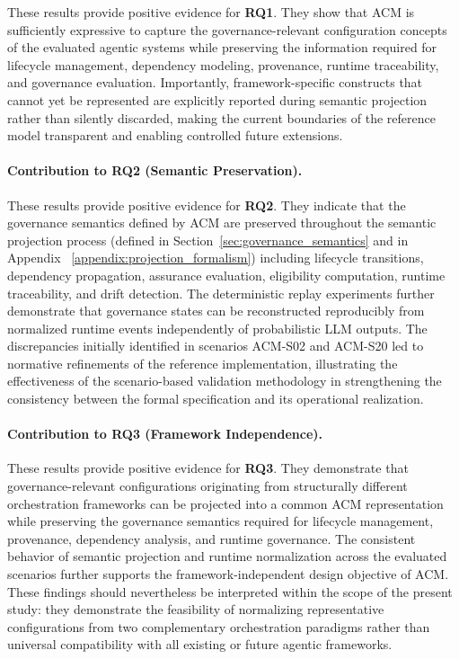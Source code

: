 \documentclass[10pt]{article}
\begin{document}
These results provide positive evidence for \textbf{RQ1}. They show that ACM is sufficiently expressive to capture the governance-relevant configuration concepts of the evaluated agentic systems while preserving the information required for lifecycle management, dependency modeling, provenance, runtime traceability, and governance evaluation. Importantly, framework-specific constructs that cannot yet be represented are explicitly reported during semantic projection rather than silently discarded, making the current boundaries of the reference model transparent and enabling controlled future extensions.

\paragraph{Contribution to RQ2 (Semantic Preservation).}

These results provide positive evidence for \textbf{RQ2}. They indicate that the governance semantics defined by ACM are preserved throughout the semantic projection process (defined in
Section~\ref{sec:governance_semantics} and in Appendix ~\ref{appendix:projection_formalism}) including lifecycle transitions, dependency propagation, assurance evaluation, eligibility computation, runtime traceability, and drift detection. The deterministic replay experiments further demonstrate that governance states can be reconstructed reproducibly from normalized runtime events independently of probabilistic LLM outputs. The discrepancies initially identified in scenarios ACM-S02 and ACM-S20 led to normative refinements of the reference implementation, illustrating the effectiveness of the scenario-based validation methodology in strengthening the consistency between the formal specification and its operational realization.

\paragraph{Contribution to RQ3 (Framework Independence).}

These results provide positive evidence for \textbf{RQ3}. They demonstrate that governance-relevant configurations originating from structurally different orchestration frameworks can be projected into a common ACM representation while preserving the governance semantics required for lifecycle management, provenance, dependency analysis, and runtime governance. The consistent behavior of semantic projection and runtime normalization across the evaluated scenarios further supports the framework-independent design objective of ACM. These findings should nevertheless be interpreted within the scope of the present study: they demonstrate the feasibility of normalizing representative configurations from two complementary orchestration paradigms rather than universal compatibility with all existing or future agentic frameworks.
\end{document}
